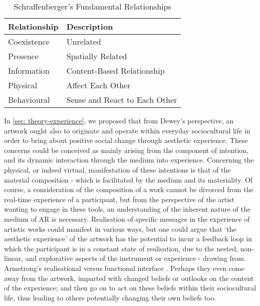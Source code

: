 \begin{table}
    \centering
    \begin{tabular}{ l l }
        \toprule
        Relationship        & Description                       \\
        \midrule
        Coexistence         & Unrelated                         \\
        Presence            & Spatially Related                 \\
        Information         & Content-Based Relationship        \\
        Physical            & Affect Each Other                 \\
        Behavioural         & Sense and React to Each Other     \\
        \bottomrule
    \end{tabular}
    \caption{Schraffenberger's Fundamental Relationships}\label{table:schraffenbergertaxonomy2}
\end{table}
In \autoref{sec: theory-experience}, we proposed that from Dewey's perspective, an artwork ought also to originate and operate within everyday sociocultural life in order to bring about positive social change through aesthetic experience. These concerns could be conceived as mainly arising from the component of intention, and its dynamic interaction through the medium into experience. Concerning the physical, or indeed virtual, manifestation of these intentions is that of the material composition - which is facilitated by the medium and its materiality. Of course, a consideration of the composition of a work cannot be divorced from the real-time experience of a participant, but from the perspective of the artist wanting to engage in these tools, an understanding of the inherent nature of the medium of AR is necessary. Realisation of specific messages in the experience of artistic works could manifest in various ways, but one could argue that `the aesthetic experience' of the artwork has the potential to incur a feedback loop in which the participant is in a constant state of realisation, due to the nested, non-linear, and explorative aspects of the instrument or experience - drawing from Armstrong's realisational versus functional interface \citeyearpar{armstrong2006}. Perhaps they even come away from the artwork, imparted with changed beliefs or outlooks on the content of the experience; and then go on to act on these beliefs within their sociocultural life, thus leading to others potentially changing their own beliefs too.

